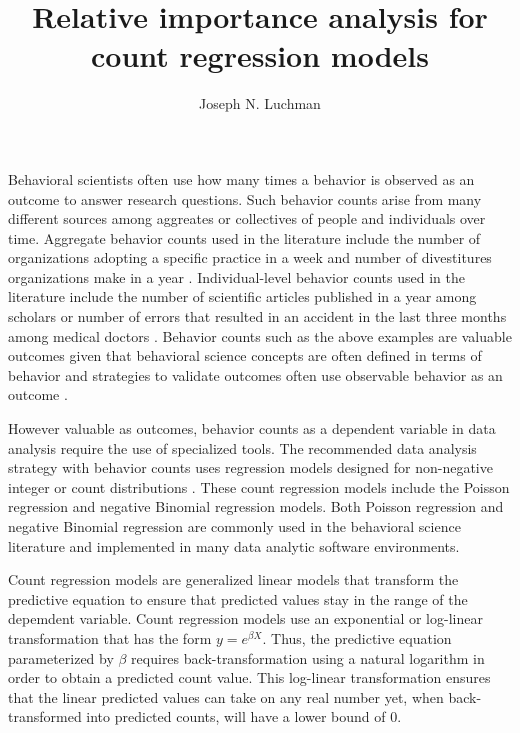 \documentclass[man]{apa7}
\title{Relative importance analysis for count regression models}
\author{Joseph N. Luchman}
\affiliation{Fors Marsh}
\begin{document}
\maketitle

	Behavioral scientists often use how many times a behavior is observed as an outcome to answer research questions. 
	Such behavior counts arise from many different sources among aggreates or collectives of people and individuals over time.
	Aggregate behavior counts used in the literature include the number of organizations adopting a specific practice in a week \parencite{naumovska2021strength} and number of divestitures organizations make in a year \parencite{bettinazzi2021stakeholder}. 
	Individual-level behavior counts used in the literature include the number of scientific articles published in a year among scholars \parencite{rotolo2013does} or number of errors that resulted in an accident in the last three months among medical doctors \parencite{naveh2015active}.
	Behavior counts such as the above examples are valuable outcomes given that behavioral science concepts are often defined in terms of behavior \parencite[e.g., job performance;][]{motowidlo2003job} and strategies to validate outcomes often use observable behavior as an outcome \parencite[e.g., criterion-oriented validity;][]{cronbach1955construct}.
	
	However valuable as outcomes, behavior counts as a dependent variable in data analysis require the use of specialized tools.
	The recommended data analysis strategy with behavior counts uses regression models designed for non-negative integer or count distributions \parencite[e.g.,][]{blevins2015count}.
	These count regression models include the Poisson regression and negative Binomial regression models.
	Both Poisson regression and negative Binomial regression are commonly used in the behavioral science literature and implemented in many data analytic software environments.
	
	Count regression models are generalized linear models that transform the predictive equation to ensure that predicted values stay in the range of the depemdent variable.
	Count regression models use an exponential or log-linear transformation that has the form $y = e^{\beta X}$. 
	Thus, the predictive equation parameterized by $\beta$ requires back-transformation using a natural logarithm in order to obtain a predicted count value.
	This log-linear transformation ensures that the linear predicted values can take on any real number yet, when back-transformed into predicted counts, will have a lower bound of 0.
	
\end{document}
